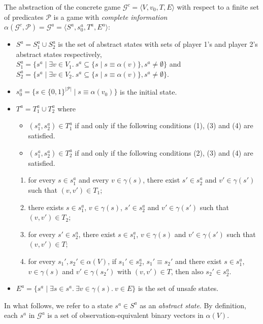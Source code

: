 \documentclass[letterpaper, 10 pt, conference]{ieeeconf}
\providecommand{\abs}[1]{\lvert#1\rvert}
\begin{document}
The abstraction of the concrete game $\mathcal{G}^c = \langle
V,v_0, T, E\rangle$
with respect to a finite set of predicates $\mathcal{P}$ is a game
with \emph{complete information}
$\alpha(\mathcal{G}^c,
\mathcal{P}) =\mathcal{G}^a = \langle S^a, s_0^a, T^a, E^a\rangle$:
\begin{itemize}
\item $S^a= S_1^a \cup S_2^a$ is the set of abstract states with sets of player 1's and player 2's abstract states respectively, \\
 $S_1^a = \{ s^a \mid \exists v\in V_1.\ s^a \subseteq \{s\mid s\equiv \alpha(v)\},s^a\not = \emptyset\}$ and\\
 $S_2^a= \{ s^a \mid \exists v\in V_2.\  s^a \subseteq \{s\mid s\equiv \alpha(v)\},s^a\not = \emptyset\}$.
\item $s_0^a= \{s \in \{0,1\}^{\abs{\mathcal{P}}} \mid s \equiv
  \alpha(v_0)\}$ is the initial state.
\item $T^a = T_1^a\cup T_2^a$ where 
\begin{itemize}
\item $(s^a_1,s^a_2)\in T_1^a$ if and only if the following conditions
  (1), (3) and (4) are satisfied.
\item $(s_1^a, s_2^a)\in T_2^a$ if and only if the following
  conditions (2), (3) and (4)
  are satisfied.
\end{itemize}
\begin{enumerate}[(1)]
\item \label{must} for every
    $s \in s^a_1$ and every
  $v\in \gamma(s)$, there exist $s'\in s^a_2$ and
  $v'\in \gamma(s')$ such that $(v,v')\in T_1$; 
\item \label{may}  there exists $s\in s_1^a$, $v\in \gamma(s)$,
  $s'\in s_2^a$ and $v'\in \gamma(s')$ such that $(v,v')\in T_2$;
\item\label{rel2} for every  $s' \in s^a_2 $, there exist $s \in s^a_1$, $v\in \gamma(s)$ and $v'\in \gamma(s')$ such that
  $(v,v')\in T$;
\item \label{rel3} for every $s_1', s_2' \in \alpha(V)$, if
  $s_1'\in s^a_2$, $s_1' \equiv s_2'$ and there exist $s\in s_1^a$, $v\in \gamma(s)$ and $v'\in \gamma(s_2')$ with $(v,v')\in T$, then also $s_2 ' \in s^a_2$.
\end{enumerate}
\item $E^a = \{s^a \mid \exists s \in s^a.\ \exists v\in \gamma(s).\ v
  \in E\}$ is the set of unsafe states. 
\end{itemize}
In what follows, we refer to a state $s^a\in S^a$ as an \emph{abstract
  state}.  By definition, each $s^a$ in $\mathcal{G}^a$ is a set
of observation-equivalent binary vectors in $\alpha(V)$.
\end{document}
